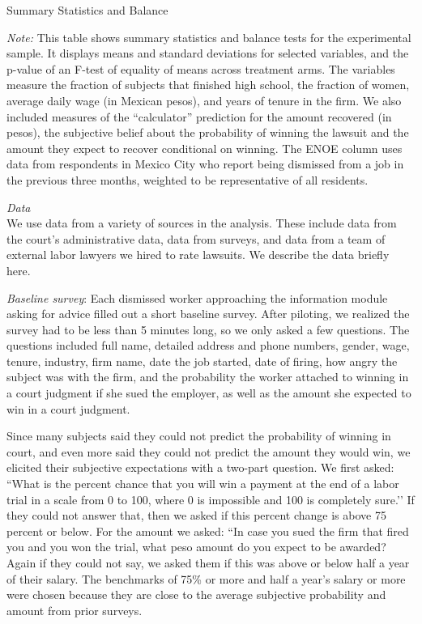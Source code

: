 \documentclass[12 pt]{article}
\newenvironment{figurenotes}[1][\footnotesize{Note}]{\begin{minipage}[t]{\linewidth}\footnotesize{\itshape#1: }}{\end{minipage}}
\begin{document}
\begin{table}[!ht]
    \caption{Summary Statistics and Balance}
    \label{tab:SS}
    \center
    \scriptsize{}
    
    \begin{figurenotes}
    This table shows summary statistics and balance tests for the experimental sample. It displays means and standard deviations for selected variables, and the p-value of an F-test of equality of means across treatment arms. The variables measure the fraction of subjects that finished high school, the fraction of women, average daily wage (in Mexican pesos), and years of tenure in the firm. We also included measures of the “calculator” prediction for the amount recovered (in pesos), the subjective belief about the probability of winning the lawsuit and the amount they expect to recover conditional on winning. The ENOE column uses data from respondents in Mexico City who report being dismissed from a job in the previous three months, weighted to be representative of all residents.
    \end{figurenotes}
  
\end{table}


\[\]
\emph{Data}\\
We use data from a variety of sources in the analysis. These include data from the court’s administrative data, data from surveys, and data from a team of external labor lawyers we hired to rate lawsuits. We describe the data briefly here. 

\emph{Baseline survey}: Each dismissed worker approaching the information module asking for advice filled out a short baseline survey. After piloting, we realized the survey had to be less than 5 minutes long, so we only asked a few questions. The questions included full name, detailed address and phone numbers, gender, wage, tenure, industry, firm name, date the job started, date of firing, how angry the subject was with the firm, and the probability the worker attached to winning in a court judgment if she sued the employer, as well as the amount she expected to win in a court judgment. 

Since many subjects said they could not predict the probability of winning in court, and even more said they could not predict the amount they would win, we elicited their subjective expectations with a two-part question. We first asked: “What is the percent chance that you will win a payment at the end of a labor trial in a scale from 0 to 100, where 0 is impossible and 100 is completely sure.’’ If they could not answer that, then we asked if this percent change is above 75 percent or below. For the amount we asked: “In case you sued the firm that fired you and you won the trial, what peso amount do you expect to be awarded? Again if they could not say, we asked them if this was above or below half a year of their salary. The benchmarks of 75\% or more and half a year’s salary or more were chosen because they are close to the average subjective probability and amount from prior surveys. 
\end{document}
